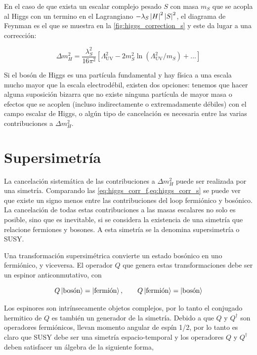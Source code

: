 En el caso de que exista un escalar complejo pesado $S$ con masa $m_S$ que se
acopla al Higgs con un termino en el Lagrangiano $-\lambda_S \left| H \right|^2
\left| S \right|^2$, el diagrama de Feynman es el que se muestra en la
\cref{fig:higgs_correction_s} y este da lugar a una corrección:

\begin{equation}
  \Delta m_H^2 = \frac{\lambda_S^2}{16\pi^2} \left[ \Lambda^2_\text{UV} - 2
    m_S^2 \ln (\Lambda^2_\text{UV}/m_S) + \ldots \right]
  \label{eq:higgs_corr_s}
\end{equation}

Si el bosón de Higgs es una partícula fundamental y hay física a una escala
mucho mayor que la escala electrodébil, existen dos opciones: tenemos que hacer
alguna suposición bizarra que no existe ninguna partícula de mayor masa o
efectos que se acoplen (incluso indirectamente o extremadamente débiles) con el
campo escalar de Higgs, o algún tipo de cancelación es necesaria entre las
varias contribuciones a $\Delta m_H^2$.

\section{Supersimetría}

La cancelación sistemática de las contribuciones a $\Delta m_H^2$ puede ser
realizada por una simetría. Comparando las
\cref{eq:higgs_corr_f,eq:higgs_corr_s} se puede ver que existe un signo menos
entre las contribuciones del loop fermiónico y bosónico. La cancelación de todas
estas contribuciones a las masas escalares no solo es posible, sino que es
inevitable, si se considera la existencia de una simetría que relacione fermiones y
bosones. A esta simetría se la denomina supersimetría o SUSY.

Una transformación supersimétrica convierte un estado bosónico en uno
fermiónico, y viceversa. El operador $Q$ que genera estas transformaciones debe
ser un espinor anticonmutativo, con

\begin{equation}
  Q \left| \text{bosón} \right> = \left| \text{fermión} \right>, \quad \quad Q
  \left| \text{fermión} \right> = \left| \text{bosón} \right>
\end{equation}

Los espinores son intrínsecamente objetos complejos, por lo tanto el conjugado
hermitico de $Q$ es también un generador de la simetría. Debido a que $Q$ y
$Q^\dagger$ son operadores fermiónicos, llevan momento angular de espín 1/2, por
lo tanto es claro que SUSY debe ser una simetría espacio-temporal y los
operadores $Q$ y $Q^\dagger$ deben satisfacer un álgebra de la siguiente forma,

